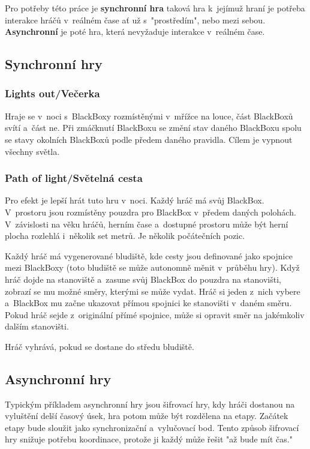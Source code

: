 \newpage



Pro potřeby této práce je \textbf{synchronní hra} taková hra k~jejímuž hraní je potřeba interakce hráčů v~reálném čase ať už s~"prostředím", nebo mezi sebou.
\textbf{Asynchronní} je poté hra, která nevyžaduje interakce v~reálném čase.

\subsection{Synchronní hry}

\subsubsection{Lights out/Večerka}

Hraje se v~noci s~BlackBoxy rozmístěnými v~mřížce na louce, část BlackBoxů svítí a~část ne.
Při zmáčknutí BlackBoxu se změní stav daného BlackBoxu spolu se stavy okolních BlackBoxů podle předem daného pravidla.
Cílem je vypnout všechny světla.

\subsubsection{Path of light/Světelná cesta}

Pro efekt je lepší hrát tuto hru v~noci.
Každý hráč má svůj BlackBox.
V~prostoru jsou rozmístěny pouzdra pro BlackBox v~předem daných polohách.
V~závislosti na věku hráčů, herním čase a~dostupné prostoru může být herní plocha rozlehlá i~několik set metrů.
Je několik počátečních pozic.

Každý hráč má vygenerované bludiště, kde cesty jsou definované jako spojnice mezi BlackBoxy (toto bludiště se může autonomně měnit v~průběhu hry).
Když hráč dojde na stanoviště a~zasune svůj BlackBox do pouzdra na stanovišti, zobrazí se mu možné směry, kterými se může vydat.
Hráč si jeden z~nich vybere a~BlackBox mu začne ukazovat přímou spojnici ke stanovišti v~daném směru.
Pokud hráč sejde z~originální přímé spojnice, může si opravit směr na jakémkoliv dalším stanovišti.

Hráč vyhrává, pokud se dostane do středu bludiště.


\subsection{Asynchronní hry}

Typickým příkladem asynchronní hry jsou šifrovací hry, kdy hráči dostanou na vyluštění delší časový úsek, hra potom může být rozdělena na etapy.
Začátek etapy bude sloužit jako synchronizační a~vylučovací bod.
Tento způsob šifrovací hry snižuje potřebu koordinace, protože ji každý může řešit "až bude mít čas."
